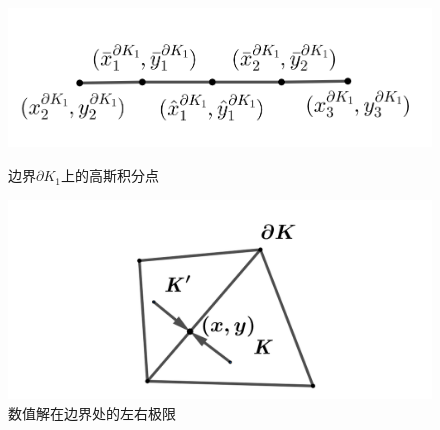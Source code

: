\documentclass[a4paper, 12pt, UTF8]{ctexart}
\begin{document}
 \begin{figure}[h]
 \centering
 \begin{minipage}[b]{0.45\textwidth}
     \centering
     \includegraphics[width=\textwidth]{images/4.png}
     \caption{边界$\partial K_{1}$上的高斯积分点}
     \label{gaussianpoint}
 \end{minipage}
 \hspace{0.05\textwidth}
 \begin{minipage}[b]{0.45\textwidth}
     \centering
     \includegraphics[width=\textwidth]{images/5.png}
     \caption{数值解在边界处的左右极限}
     \label{solutionlimit}
 \end{minipage}
 \end{figure}
 
\end{document}
